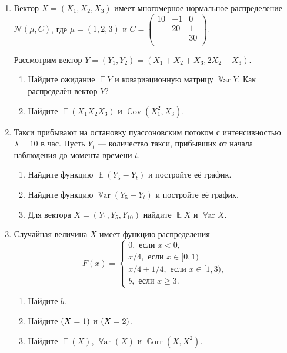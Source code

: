 \documentclass[12pt]{article}
\DeclareMathOperator{\Cov}{\mathbb{C}ov}
\DeclareMathOperator{\Corr}{\mathbb{C}orr}
\DeclareMathOperator{\Var}{\mathbb{V}ar}
\let\P\relax
\DeclareMathOperator{\P}{\mathbb{P}}
\DeclareMathOperator{\E}{\mathbb{E}}
\newcommand \cN{\mathcal{N}}
\begin{document}
\begin{enumerate}
    \item %
    Вектор $X = (X_1, X_2, X_3)$ имеет многомерное нормальное распределение $\cN(\mu, C)$,
    где $\mu = (1, 2, 3)$ и $C = \begin{pmatrix}
        10 & -1 & 0 \\
         & 20 & 1 \\
         & & 30 \\
    \end{pmatrix}$. 

    Рассмотрим вектор $Y = (Y_1, Y_2) = (X_1 + X_2 + X_3, 2X_2 - X_3)$.
    \begin{enumerate}
        \item Найдите ожидание $\E Y$ и ковариационную матрицу $\Var Y$. Как распределён вектор $Y$?
        \item Найдите $\E(X_1 X_2 X_3)$ и $\Cov(X_1^2, X_3)$.
    \end{enumerate}
    
    \item %
    Такси прибывают на остановку пуассоновским потоком с интенсивностью $\lambda = 10$ в час. 
    Пусть $Y_t$ — количество такси, прибывших от начала наблюдения до момента времени $t$.
    \begin{enumerate}
        \item Найдите функцию $\E(Y_{5} - Y_t)$ и постройте её график.
        \item Найдите функцию $\Var(Y_{5} - Y_t)$ и постройте её график.
        \item Для вектора $X = (Y_1, Y_5, Y_{10})$ найдите $\E X$ и $\Var X$.
    \end{enumerate}

    \item %
Случайная величина $X$ имеет функцию распределения
\[
F(x) = \begin{cases}
    0, \text{ если } x< 0, \\
    x/4, \text{ если } x \in [0, 1) \\
    x/4 + 1/4, \text{ если } x\in [1, 3), \\
    b, \text{ если } x \geq 3. 
\end{cases}
\]
\begin{enumerate}
    \item Найдите $b$. 
    \item Найдите $\P(X = 1)$ и $\P(X = 2)$.
    \item Найдите $\E(X)$, $\Var(X)$ и $\Corr(X, X^2)$.
\end{enumerate}

\end{enumerate}
\end{document}
